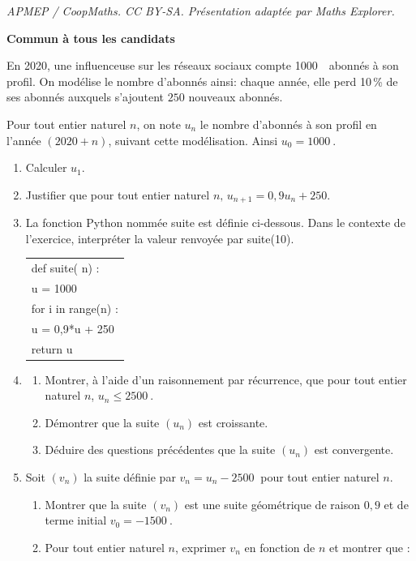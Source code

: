 \documentclass[10pt]{article}
\providecommand{\np}[2][]{{#2~#1}}
\begin{document}
\noindent\textit{APMEP / CoopMaths. CC BY-SA. Présentation adaptée par Maths Explorer.}\par\medskip
\textbf{Commun à tous les candidats}

\medskip

En 2020, une influenceuse sur les réseaux sociaux compte \np{1000}~abonnés à son profil. On modélise le nombre d'abonnés ainsi: chaque année, elle perd 10\,\% de ses abonnés auxquels s'ajoutent $250$ nouveaux abonnés.

Pour tout entier naturel $n$, on note $u_n$ le nombre d'abonnés à son profil en l'année $(2020 + n)$, suivant cette modélisation. Ainsi $u_0 = \np{1000}$.

\medskip

\begin{enumerate}
\item Calculer $u_1$.
\item Justifier que pour tout entier naturel $n,\,  u_{n+1} = 0,9u_n + 250$.
\item La fonction Python nommée \og suite \fg{} est définie ci-dessous. Dans le contexte de l'exercice, interpréter la valeur renvoyée par suite(10).

\begin{center}
\begin{tabular}{|l|}\hline
def suite( n) :\\
\quad u = \np{1000}\\
\quad for i in range(n) :\\
\qquad  u = 0,9*u + 250\\
\quad return u\\ \hline
\end{tabular}
\end{center}

\item 
	\begin{enumerate}
		\item Montrer, à l'aide d'un raisonnement par récurrence, que pour tout entier naturel $n$,
$u_n \leqslant  \np{2500}$.
		\item Démontrer que la suite $\left(u_n\right)$ est croissante.
		\item Déduire des questions précédentes que la suite $\left(u_n\right)$ est convergente.
	\end{enumerate}
\item Soit $\left(v_n\right)$ la suite définie par $v_n = u_n - \np{2500}$ pour tout entier naturel $n$.
	\begin{enumerate}
		\item Montrer que la suite $\left(v_n\right)$ est une suite géométrique de raison $0,9$ et de terme initial $v_0 = \np{- 1500}$.
		\item Pour tout entier naturel $n$, exprimer $v_n$ en fonction de $n$ et montrer que :
		

\end{enumerate}
\end{enumerate}
\end{document}
